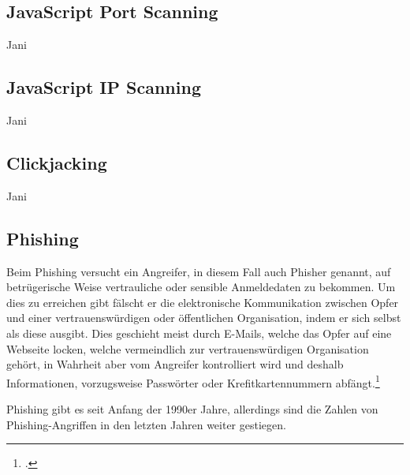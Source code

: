 
\subsection{JavaScript Port Scanning}

\todo Jani

\subsection{JavaScript IP Scanning}

\todo Jani

\subsection{Clickjacking}

\todo Jani

\subsection{Phishing}

Beim Phishing versucht ein Angreifer, in diesem Fall auch Phisher genannt, auf betrügerische Weise vertrauliche oder sensible Anmeldedaten zu bekommen. Um dies zu erreichen gibt fälscht er die elektronische Kommunikation zwischen Opfer und einer vertrauenswürdigen oder öffentlichen Organisation, indem er sich selbst als diese ausgibt. Dies geschieht meist durch E-Mails, welche das Opfer auf eine Webseite locken, welche vermeindlich zur vertrauenswürdigen Organisation gehört, in Wahrheit aber vom Angreifer kontrolliert wird und deshalb Informationen, vorzugsweise Passwörter oder Krefitkartennummern abfängt.\footcite[Vgl.][1]{phishing}

Phishing gibt es seit Anfang der 1990er Jahre, allerdings sind die Zahlen von Phishing-Angriffen in den letzten Jahren weiter gestiegen.


